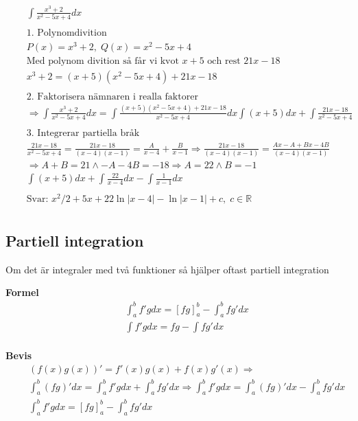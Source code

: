 \documentclass{article}
\begin{document}
\begin{align*}
  &\quad  \int \frac{x^3+2}{x^2-5x+4}dx \\
  &\quad  \\
  &\quad  \text{1. Polynomdivition} \\
  &\quad  P(x)=x^3+2, \; Q(x)=x^2-5x+4 \\
  &\quad  \text{Med polynom divition så får vi kvot $x+5$ och rest $21x-18$} \\
  &\quad  x^3+2=(x+5)(x^2-5x+4) + 21x-18 \\
  &\quad  \\
  &\quad  \text{2. Faktorisera nämnaren i realla faktorer} \\
  &\quad  \Rightarrow \int \frac{x^3+2}{x^2-5x+4}dx = \int \frac{(x+5)(x^2-5x+4) + 21x-18}{x^2-5x+4}dx
  \int (x+5)dx + \int \frac{21x-18}{x^2-5x+4} \\
  &\quad  \\
  &\quad  \text{3. Integrerar partiella bråk} \\
  &\quad  \frac{21x-18}{x^2-5x+4} = \frac{21x-18}{(x-4)(x-1)} = \frac{A}{x-4} + \frac{B}{x-1}
  \Rightarrow \frac{21x-18}{(x-4)(x-1)} = \frac{Ax-A+Bx-4B}{(x-4)(x-1)} \\
  &\quad  \Rightarrow A+B=21 \land -A-4B=-18 \Rightarrow A=22 \land B=-1 \\
  &\quad  \int (x+5)dx + \int \frac{22}{x-4}dx - \int \frac{1}{x-1}dx \\
  &\quad  \\
  &\quad  \text{Svar: } x^2/2 +5x +22\ln{|x-4|} -\ln{|x-1|} +c, \; c \in \mathbb{R} \\
\end{align*}


\newpage


\subsection{Partiell integration}
Om det är integraler med två funktioner så hjälper oftast partiell integration

\textbf{Formel}
\begin{align*}
  &\quad  \int_a^b f'g dx={[fg]}_a^b-\int_a^b fg' dx \\
  &\quad  \int f'g dx= fg-\int fg' dx \\
\end{align*}

\textbf{Bevis}
\begin{align*}
  &\quad  (f(x)g(x))'=f'(x)g(x)+f(x)g'(x) \Rightarrow \\
  &\quad  \int_a^b (fg)' dx= \int_a^b f'g dx + \int_a^b fg' dx
  \Rightarrow  \int_a^b f'g dx = \int_a^b (fg)' dx - \int_a^b fg' dx \\
  &\quad \int_a^b f'g dx={[fg]}_a^b-\int_a^b fg' dx \\
\end{align*}
\end{document}
